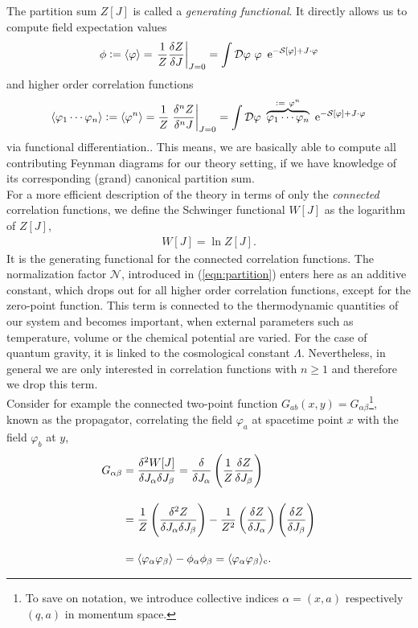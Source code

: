 The partition sum $Z[J]$ is called a \textit{generating functional}. It directly allows us to compute field expectation values
\begin{align}
	\phi := \cf{\varphi} = \eval{\frac{1}{Z}\frac{\delta Z}{\delta J}}_{J=0} = \int \D\varphi \ \varphi \ \operatorname{e}^{-\S + J\cdot\varphi}
\end{align}
and higher order correlation functions
\begin{align}
\cf{\varphi_1 \cdots \varphi_n} := \cf{\varphi^n} = \frac{1}{Z}\eval{\frac{\delta^n Z}{\delta^n J}}_{J=0} = \int \D\varphi \ \overbrace{\varphi_1 \cdots \varphi_n}^{:= \ \varphi^n} \ \operatorname{e}^{-\S + J\cdot\varphi}
\end{align}
via functional differentiation.. This means, we are basically able to compute all contributing Feynman diagrams for our theory setting, if we have knowledge of its corresponding (grand) canonical partition sum. \\
 For a more efficient description of the theory in terms of only the \textit{connected} correlation functions, we define the Schwinger functional $W[J]$ as the logarithm of $Z[J]$,  
\begin{align}
W[J] = \ln Z[J].
\label{eqn:Schwinger}
\end{align}
It is the generating functional for the connected correlation functions. The normalization factor $\mathcal{N}$, introduced in (\ref{eqn:partition}) enters here as an additive constant, which drops out for all higher order correlation functions, except for the zero-point function. This term is connected to the thermodynamic quantities of our system and becomes important, when external parameters such as temperature, volume or the chemical potential are varied. For the case of quantum gravity, it is linked to the cosmological constant $\Lambda$. Nevertheless, in general we are only interested in correlation functions with $n\geq 1$ and therefore we drop this term.\\
Consider for example the connected two-point function $G_{ab}(x,y) = G_{\alpha\beta}$\footnote{To save on notation, we introduce collective indices $\alpha = (x,a)$ respectively $(q,a)$ in momentum space.}, known as the propagator, correlating the field $\varphi_a$ at spacetime point $x$ with the field $\varphi_b$ at $y$,
\begin{align}
	G_{\alpha\beta} &= \frac{\delta^2W[J]}{\delta J_{\alpha}\delta J_{\beta}} = \frac{\delta}{\delta J_{\alpha}}\left(\frac{1}{Z}\frac{\delta Z}{\delta J_{\beta}}\right) \nonumber \\[10pt]
				&= \frac{1}{Z}\left(\frac{\delta^2Z}{\delta J_{\alpha}\delta J_{\beta}}\right) - \frac{1}{Z^2}\left(\frac{\delta Z}{\delta J_{\alpha}}\right)\left(\frac{\delta Z}{\delta J_{\beta}}\right)\\[10pt]
				&= \langle \varphi_{\alpha}\varphi_{\beta} \rangle - \phi_{\alpha}\phi_{\beta} = \langle \varphi_{\alpha}\varphi_{\beta} \rangle_{\text{c}}.	\nonumber	
\end{align}
